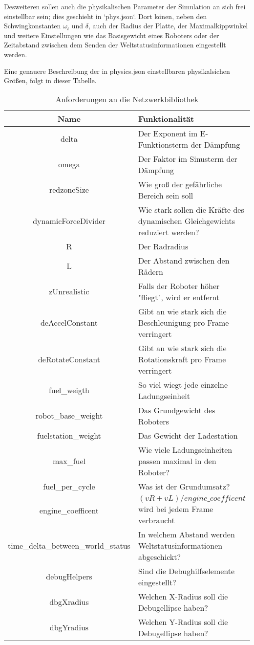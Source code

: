 \documentclass[
    12pt,
    bibliography=totoc,
    ngerman,
    enabledeprecatedfontcommands
]{scrartcl}
\begin{document}
Desweiteren sollen auch die physikalischen Parameter der Simulation an sich frei einstellbar sein; dies geschieht in `phys.json`. Dort k{\"{o}}nen, neben den Schwingkonstanten
$\omega_t$ und $\delta$, auch der Radius der Platte, der Maximalkippwinkel und weitere Einstellungen wie das Basisgewicht eines Roboters oder der Zeitabstand zwischen dem
Senden der Weltstatusinformationen eingestellt werden.


Eine genauere Beschreibung der in physics.json einstellbaren physikalsichen Gr{\"{o}}{\ss}en, folgt in dieser Tabelle.
\begin{table}[h]
\centering
	\begin{tabular}{c | p{8cm}}
	\toprule
	Name & Funktionalit{\"{a}}t \\
	\midrule
	delta & Der Exponent im E-Funktionsterm der D{\"{a}}mpfung \\
	omega & Der Faktor im Sinusterm der D{\"{a}}mpfung \\
	redzoneSize & Wie gro{\ss} der gef{\"{a}}hrliche Bereich sein soll \\
	dynamicForceDivider & Wie stark sollen die Kr{\"{a}}fte des dynamischen Gleichgewichts reduziert werden? \\
	R & Der Radradius \\
	L & Der Abstand zwischen den R{\"{a}}dern \\
	zUnrealistic & Falls der Roboter h{\"{o}}her "fliegt", wird er entfernt \\
	deAccelConstant & Gibt an wie stark sich die Beschleunigung pro Frame verringert \\
	deRotateConstant & Gibt an wie stark sich die Rotationskraft pro Frame verringert \\
	fuel\_weigth & So viel wiegt jede einzelne Ladungseinheit\\
	robot\_base\_weight & Das Grundgewicht des Roboters \\
	fuelstation\_weight & Das Gewicht der Ladestation \\
	max\_fuel & Wie viele Ladungseinheiten passen maximal in den Roboter? \\
	fuel\_per\_cycle & Was ist der Grundumsatz? \\
	engine\_coefficent & $(vR + vL) / engine\_coefficent$ wird bei jedem Frame verbraucht \\
	time\_delta\_between\_world\_status & In welchem Abstand werden Weltstatusinformationen abgeschickt? \\
	debugHelpers & Sind die Debughilfselemente eingestellt? \\
	dbgXradius & Welchen X-Radius soll die Debugellipse haben? \\
	dbgYradius & Welchen Y-Radius soll die Debugellipse haben? \\
	\bottomrule
\end{tabular}
\caption{Anforderungen an die Netzwerkbibliothek}
\end{table}
\end{document}
